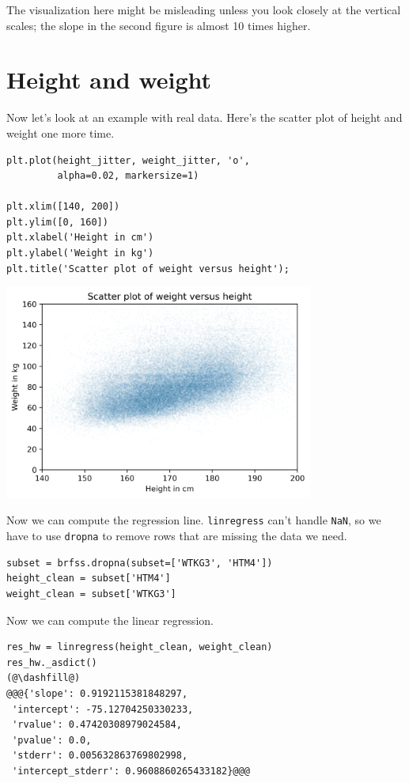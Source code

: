 The visualization here might be misleading unless you look closely at
the vertical scales; the slope in the second figure is almost 10 times
higher.

\hypertarget{height-and-weight}{%
\section{Height and weight}\label{height-and-weight}}

Now let's look at an example with real data. Here's the scatter plot of
height and weight one more time.

\begin{lstlisting}[]
plt.plot(height_jitter, weight_jitter, 'o', 
         alpha=0.02, markersize=1)

plt.xlim([140, 200])
plt.ylim([0, 160])
plt.xlabel('Height in cm')
plt.ylabel('Weight in kg')
plt.title('Scatter plot of weight versus height');
\end{lstlisting}

\begin{center}
\includegraphics[width=4in]{09_relationships_files/09_relationships_93_0.png}
\end{center}

Now we can compute the regression line.
\passthrough{\lstinline!linregress!} can't handle
\passthrough{\lstinline!NaN!}, so we have to use
\passthrough{\lstinline!dropna!} to remove rows that are missing the
data we need.

\begin{lstlisting}[]
subset = brfss.dropna(subset=['WTKG3', 'HTM4'])
height_clean = subset['HTM4']
weight_clean = subset['WTKG3']
\end{lstlisting}

Now we can compute the linear regression.

\begin{lstlisting}[]
res_hw = linregress(height_clean, weight_clean)
res_hw._asdict()
(@\dashfill@)
@@@{'slope': 0.9192115381848297,
 'intercept': -75.12704250330233,
 'rvalue': 0.47420308979024584,
 'pvalue': 0.0,
 'stderr': 0.005632863769802998,
 'intercept_stderr': 0.9608860265433182}@@@
\end{lstlisting}

